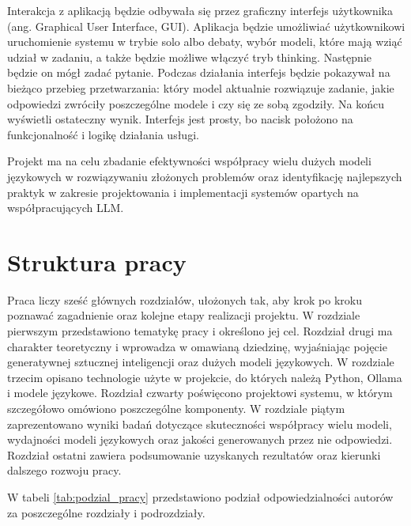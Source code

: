 Interakcja z aplikacją będzie odbywała się przez graficzny interfejs użytkownika (ang. Graphical User Interface, GUI). Aplikacja będzie umożliwiać użytkownikowi uruchomienie systemu w trybie solo albo debaty, wybór modeli, które mają wziąć udział w zadaniu, a także będzie możliwe włączyć tryb thinking. Następnie będzie on mógł zadać pytanie. Podczas działania interfejs będzie pokazywał na bieżąco przebieg przetwarzania: który model aktualnie rozwiązuje zadanie, jakie odpowiedzi zwróciły poszczególne modele i czy się ze sobą zgodziły. Na końcu wyświetli ostateczny wynik. Interfejs jest prosty, bo nacisk położono na funkcjonalność i logikę działania usługi.

Projekt ma na celu zbadanie efektywności współpracy wielu dużych modeli językowych w rozwiązywaniu złożonych problemów oraz identyfikację najlepszych praktyk w zakresie projektowania i implementacji systemów opartych na współpracujących LLM.

\section{Struktura pracy}

Praca liczy sześć głównych rozdziałów, ułożonych tak, aby krok po kroku poznawać zagadnienie oraz kolejne etapy realizacji projektu. W rozdziale pierwszym przedstawiono tematykę pracy i określono jej cel. Rozdział drugi ma charakter teoretyczny i wprowadza w omawianą dziedzinę, wyjaśniając pojęcie generatywnej sztucznej inteligencji oraz dużych modeli językowych. W rozdziale trzecim opisano technologie użyte w projekcie, do których należą Python, Ollama i modele językowe. Rozdział czwarty poświęcono projektowi systemu, w którym szczegółowo omówiono poszczególne komponenty. W rozdziale piątym zaprezentowano wyniki badań dotyczące skuteczności współpracy wielu modeli, wydajności modeli językowych oraz jakości generowanych przez nie odpowiedzi. Rozdział ostatni zawiera podsumowanie uzyskanych rezultatów oraz kierunki dalszego rozwoju pracy.

W tabeli \ref{tab:podzial_pracy} przedstawiono podział odpowiedzialności autorów za poszczególne rozdziały
i podrozdziały.


